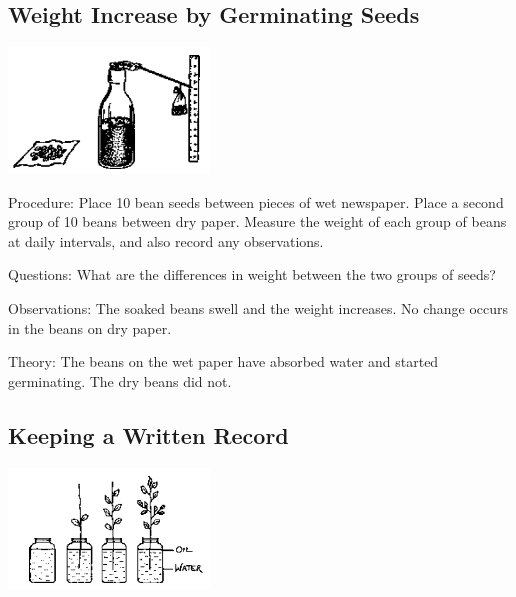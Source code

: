 \begin{multicols}{2}
\subsection{Weight Increase by Germinating Seeds}

\begin{center}
\includegraphics[width=0.4\textwidth]{./img/source/data-weight.png}
\end{center}

\begin{description*}
\item[Procedure:]{Place 10 bean seeds between pieces of wet newspaper. Place a second group of 10
beans between dry paper. Measure the weight of each group of beans at daily intervals, and
also record any observations.}
\item[Questions:]{What are the differences in weight between the two groups of seeds?}
\item[Observations:]{The soaked beans swell and the weight increases. No change occurs in the beans on dry
paper.}
\item[Theory:]{The beans on the wet paper have absorbed water and started germinating. The dry beans
did not.}
\end{description*}

\subsection{Keeping a Written Record}

\begin{center}
\includegraphics[width=0.4\textwidth]{./img/source/written-record.png}
\end{center}


\end{multicols}
